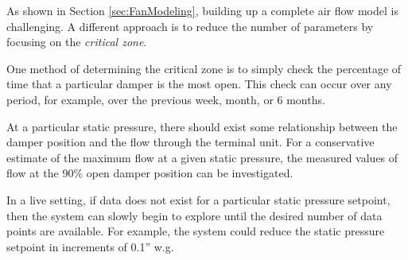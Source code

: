 As shown in Section \ref{sec:FanModeling}, building up a complete air
flow model is challenging. A different approach is to reduce the number
of parameters by focusing on the \textit{critical zone}.

One method of determining the critical zone is to simply check the
percentage of time that a particular damper is the most open. This check
can occur over any period, for example, over the previous week, month,
or 6 months.

At a particular static pressure, there should exist some relationship
between the damper position and the flow through the terminal unit. For
a conservative estimate of the maximum flow at a given static pressure,
the measured values of flow at the 90\% open damper position can be
investigated.

In a live setting, if data does not exist for a particular static
pressure setpoint, then the system can slowly begin to explore until the
desired number of data points are available. For example, the system
could reduce the static pressure setpoint in increments of 0.1'' w.g.




%
%
%
%
%
%
%
%


